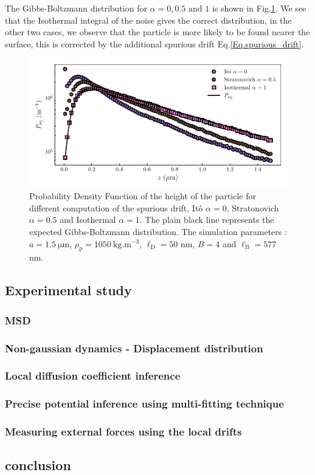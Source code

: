 The Gibbs-Boltzmann distribution for $\alpha = 0 , 0.5 \text{ and } 1 $ is shown in Fig.\ref{fig.pdf_vs_alpha}. We see that the Isothermal integral of the noise gives the correct distribution, in the other two cases, we observe that the particle is more likely to be found nearer the surface, this is corrected by the additional spurious drift Eq.\ref{Eq.spurious_drift}.

\begin{figure}[hb]
	\centering
	\includegraphics{02_body/chapter3/images/simulation_confined_Brownian_motion/Peq_vs_alpha.pdf}
	\caption{Probability Density Function of the height of the particle for different computation of the spurious drift, Itô $\alpha = 0$, Stratonovich $\alpha = 0.5$ and Isothermal $\alpha = 1$. The plain black line represents the expected Gibbs-Boltzmann distribution. The simulation parameters : $a = 1.5 ~ \mathrm{\mu m}$, $\rho_\mathrm{p} = 1050 ~\mathrm{kg.m^{-3}}$, $\ell_\mathrm{D} = 50$ nm, $B = 4$ and $\ell_\mathrm{B} = 577$ nm. }
	\label{fig.pdf_vs_alpha}
\end{figure}


\subsection{Experimental study}

\subsubsection{MSD}

\subsubsection{Non-gaussian dynamics - Displacement distribution}

\subsubsection{Local diffusion coefficient inference}

\subsubsection{Precise potential inference using multi-fitting technique}

\subsubsection{Measuring external forces using the local drifts}

\subsection{conclusion}
